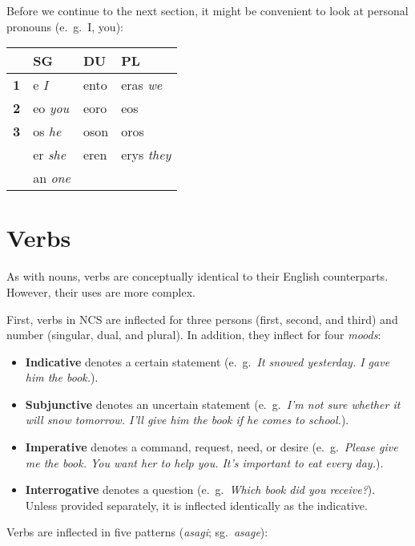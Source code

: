 Before we continue to the next section, it might be convenient to look at personal pronouns (e.~g.~I, you):

\begin{center}
  \begin{tabular}{|r|l|l|l|}
    \hline
    & \textbf{SG} & \textbf{DU} & \textbf{PL} \\ \hline
    \textbf{1} & e \emph{I} & ento & eras \emph{we} \\ \hline
    \textbf{2} & eo \emph{you} & eoro & eos \\ \hline
    \textbf{3} & os \emph{he} & oson & oros \\
    & er \emph{she} & eren & erys \emph{they} \\
    & an \emph{one} & & \\ \hline
  \end{tabular}
\end{center}

\section{Verbs}

As with nouns, verbs are conceptually identical to their English counterparts. However, their uses are more complex.

First, verbs in NCS are inflected for three persons (first, second, and third) and number (singular, dual, and plural). In addition, they inflect for four \emph{moods}:

\begin{itemize}
  \item \textbf{Indicative} denotes a certain statement (e.~g.~\emph{It snowed yesterday. I gave him the book.}).
  \item \textbf{Subjunctive} denotes an uncertain statement (e.~g.~\emph{I'm not sure whether it will snow tomorrow. I'll give him the book if he \emph{comes to school}.}).
  \item \textbf{Imperative} denotes a command, request, need, or desire (e.~g.~\emph{Please give me the book. You want her to help you. It's important to eat every day.}).
  \item \textbf{Interrogative} denotes a question (e.~g.~\emph{Which book did you receive?}). Unless provided separately, it is inflected identically as the indicative.
\end{itemize}

Verbs are inflected in five patterns (\emph{asagi}; sg.~\emph{asage}): \\

